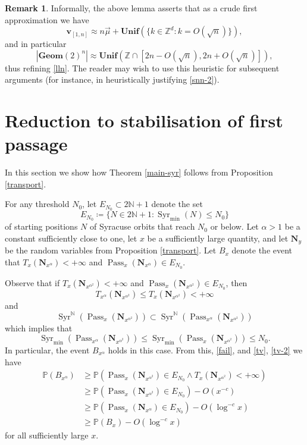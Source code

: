 \documentclass[12pt,a4paper,reqno]{amsart}
\numberwithin{equation}{section}
\theoremstyle{plain}
\theoremstyle{definition}
\newtheorem{remark}[theorem]{Remark}
\renewcommand\P{\mathbb{P}}
\newcommand\Z{\mathbb{Z}}
\newcommand\N{\mathbb{N}}
\renewcommand\v{\mathbf{v}}
\newcommand\Unif{\mathbf{Unif}}
\newcommand\Geom{\mathbf{Geom}}
\newcommand\Pass{{\operatorname{Pass}}}
\newcommand\Syr{{\operatorname{Syr}}}
\begin{document}
\begin{remark} Informally, the above lemma asserts that as a crude first approximation we have
\begin{equation}\label{ancl-0}
 \v_{[1,n]} \approx n\vec \mu + \Unif( \{ k \in \Z^d: k = O(\sqrt{n}) \} ),
\end{equation}
and in particular
\begin{equation}\label{ancl}
 |\Geom(2)^n| \approx \Unif( \Z \cap [2n - O(\sqrt{n}), 2n + O(\sqrt{n})] ),
\end{equation}
thus refining \eqref{lln}.   The reader may wish to use this heuristic for subsequent arguments (for instance, in heuristically justifying \eqref{snn-2}). 
\end{remark}


\section{Reduction to stabilisation of first passage}\label{main-reduce}

In this section we show how Theorem \ref{main-syr} follows from Proposition \ref{transport}.

For any threshold $N_0$, let $E_{N_0} \subset 2\N+1$ denote the set 
$$ E_{N_0} \coloneqq \{ N \in 2\N+1: \Syr_{\min}(N) \leq N_0 \}$$
of starting positions $N$ of Syracuse orbits that reach $N_0$ or below.   Let $\alpha>1$ be a constant sufficiently close to one, let $x$ be a sufficiently large quantity, and let $\mathbf{N}_y$ be the random variables from Proposition \ref{transport}.  Let $B_x$ denote the event that $T_x(\mathbf{N}_{x^\alpha}) < +\infty$ and $\Pass_{x}(\mathbf{N}_{x^{\alpha}}) \in E_{N_0}$.

Observe that if $T_x( \mathbf{N}_{x^{\alpha^2}} ) < +\infty$ and $\Pass_x(\mathbf{N}_{x^{\alpha^2}}) \in E_{N_0}$, then
$$ T_{x^\alpha}( \mathbf{N}_{x^{\alpha^2}} ) \leq T_x( \mathbf{N}_{x^{\alpha^2}} ) < +\infty$$
and
$$ \Syr^\N(\Pass_x(\mathbf{N}_{x^{\alpha^2}})) \subset \Syr^\N(\Pass_{x^\alpha}(\mathbf{N}_{x^{\alpha^2}})) $$
which implies that
$$ \Syr_{\min}( \Pass_{x^\alpha}(\mathbf{N}_{x^{\alpha^2}}) ) \leq \Syr_{\min}( \Pass_x(\mathbf{N}_{x^{\alpha^2}})  ) \leq N_0.$$
In particular, the event $B_{x^\alpha}$ holds in this case.  From this, \eqref{fail}, and \eqref{tv}, \eqref{tv-2} we have
\begin{align*}
 \P( B_{x^\alpha}) &\geq \P( \Pass_{x}(\mathbf{N}_{x^{\alpha^2}}) \in E_{N_0} \wedge T_{x}( \mathbf{N}_{x^{\alpha^2}} ) < +\infty ) \\
&\geq \P( \Pass_{x}(\mathbf{N}_{x^{\alpha^2}}) \in E_{N_0} ) - O( x^{-c} ) \\
&\geq \P( \Pass_{x}(\mathbf{N}_{x^{\alpha}}) \in E_{N_0} ) - O( \log^{-c} x ) \\
&\geq \P( B_x ) - O( \log^{-c} x )
\end{align*}
for all sufficiently large $x$.
\end{document}
